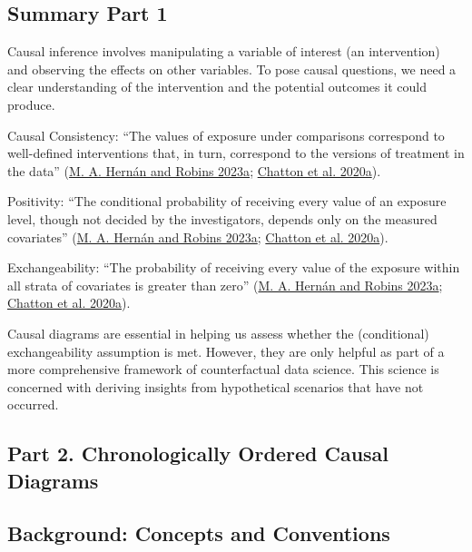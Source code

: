 \documentclass[
  singlecolumn]{report}
\begin{document}
\hypertarget{summary-part-1}{%
\subsection{Summary Part 1}\label{summary-part-1}}

Causal inference involves manipulating a variable of interest (an
intervention) and observing the effects on other variables. To pose
causal questions, we need a clear understanding of the intervention and
the potential outcomes it could produce.

Causal Consistency: ``The values of exposure under comparisons
correspond to well-defined interventions that, in turn, correspond to
the versions of treatment in the data''
(\protect\hyperlink{ref-hernuxe1n2023a}{M. A. Hernán and Robins 2023a};
\protect\hyperlink{ref-chatton2020a}{Chatton et al. 2020a}).

Positivity: ``The conditional probability of receiving every value of an
exposure level, though not decided by the investigators, depends only on
the measured covariates'' (\protect\hyperlink{ref-hernuxe1n2023a}{M. A.
Hernán and Robins 2023a}; \protect\hyperlink{ref-chatton2020a}{Chatton
et al. 2020a}).

Exchangeability: ``The probability of receiving every value of the
exposure within all strata of covariates is greater than zero''
(\protect\hyperlink{ref-hernuxe1n2023a}{M. A. Hernán and Robins 2023a};
\protect\hyperlink{ref-chatton2020a}{Chatton et al. 2020a}).

Causal diagrams are essential in helping us assess whether the
(conditional) exchangeability assumption is met. However, they are only
helpful as part of a more comprehensive framework of counterfactual data
science. This science is concerned with deriving insights from
hypothetical scenarios that have not occurred.

\hypertarget{part-2.-chronologically-ordered-causal-diagrams}{%
\subsection{Part 2. Chronologically Ordered Causal
Diagrams}\label{part-2.-chronologically-ordered-causal-diagrams}}

\hypertarget{background-concepts-and-conventions}{%
\subsection{Background: Concepts and
Conventions}\label{background-concepts-and-conventions}}
\end{document}

